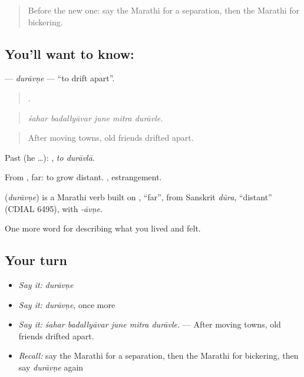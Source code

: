 \label{lesson:MR-C502-duravne}



\begin{quote}
Before the new one: say the Marathi for a separation, then the Marathi for bickering.
\end{quote}

\subsection*{You'll want to know: }
\textbf{} — \emph{durāvṇe} — \textquotedblleft{}to drift apart\textquotedblright{}.

\begin{quote}
    .
\end{quote}

\begin{quote}
\emph{śahar badallyāvar june mitra durāvle.}
\end{quote}

\begin{quote}
After moving towns, old friends drifted apart.
\end{quote}

Past (he …):  , \emph{to durāvlā}.

From , far: to grow distant. , estrangement.

\begin{cousinweb}
\textbf{} (\emph{durāvṇe}) is a Marathi verb built on , \textquotedblleft{}far\textquotedblright{}, from Sanskrit \emph{dūra}, \textquotedblleft{}distant\textquotedblright{} (CDIAL 6495), with \emph{-āvṇe}.
\end{cousinweb}

\begin{grammarlens}[title={What you've built}]
One more word for describing what you lived and felt.
\end{grammarlens}

\subsection*{Your turn}
\begin{itemize}
\raggedright
  \item \emph{Say it:} \emph{durāvṇe}
  \item \emph{Say it:} \emph{durāvṇe}, once more
  \item \emph{Say it:} \emph{śahar badallyāvar june mitra durāvle.} — After moving towns, old friends drifted apart.
  \item \emph{Recall:} say the Marathi for a separation, then the Marathi for bickering, then say \emph{durāvṇe} again
\end{itemize}

